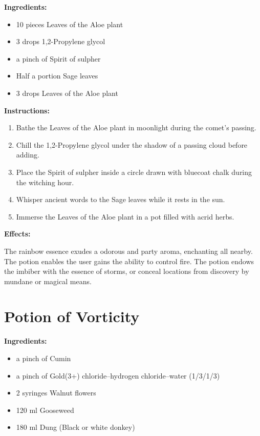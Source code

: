 \documentclass{article}
\begin{document}
\textbf{Ingredients:}

\begin{itemize}
  \item 10 pieces Leaves of the Aloe plant
  \item 3 drops 1,2-Propylene glycol
  \item a pinch of Spirit of sulpher
  \item Half a portion Sage leaves
  \item 3 drops Leaves of the Aloe plant
\end{itemize}

\textbf{Instructions:}

\begin{enumerate}
  \item Bathe the Leaves of the Aloe plant in moonlight during the comet’s passing.
  \item Chill the 1,2-Propylene glycol under the shadow of a passing cloud before adding.
  \item Place the Spirit of sulpher inside a circle drawn with bluecoat chalk during the witching hour.
  \item Whisper ancient words to the Sage leaves while it rests in the sun.
  \item Immerse the Leaves of the Aloe plant in a pot filled with acrid herbs.
\end{enumerate}

\textbf{Effects:}

The rainbow essence exudes a odorous and party aroma, enchanting all nearby. The potion enables the user gains the ability to control fire. The potion endows the imbiber with the essence of storms, or conceal locations from discovery by mundane or magical means.

\newpage
\section*{Potion of Vorticity}

\textbf{Ingredients:}

\begin{itemize}
  \item a pinch of Cumin
  \item a pinch of Gold(3+) chloride--hydrogen chloride--water (1/3/1/3)
  \item 2 syringes Walnut flowers
  \item 120 ml Gooseweed
  \item 180 ml Dung (Black or white donkey)
\end{itemize}
\end{document}
